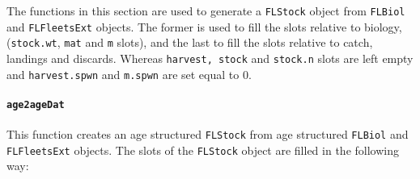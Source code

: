 The functions in this section are used to generate a \texttt{FLStock} object
from \texttt{FLBiol} and \texttt{FLFleetsExt} objects. The former is used to 
fill the slots relative to biology, (\texttt{stock.wt}, \texttt{mat} and \texttt{m} slots), and  the 
last to fill the slots relative to catch, landings and discards. 
Whereas \texttt{harvest, stock} and \texttt{stock.n} slots are left empty and
\texttt{harvest.spwn} and \texttt{m.spwn} are set equal to 0.    

\paragraph{\texttt{age2ageDat}} \hspace{0pt} \smallskip
	This function creates an age structured \texttt{FLStock} from age structured 
	\texttt{FLBiol} and \texttt{FLFleetsExt} objects. The  slots 
of the \texttt{FLStock} object are filled in the following way:
	
